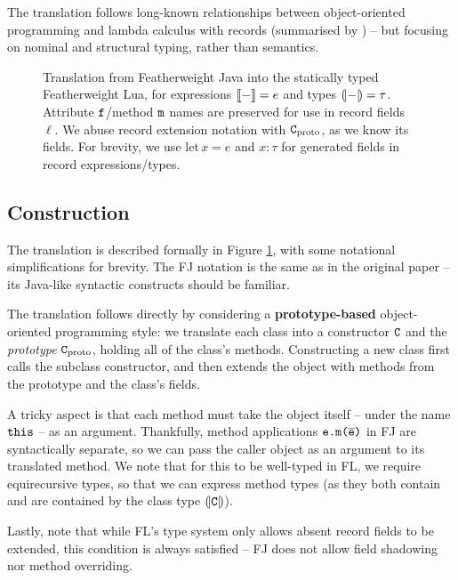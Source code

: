The translation follows long-known relationships between object-oriented programming and lambda calculus with records (summarised by \eg{} \textcite{pierce-thesis}) -- but focusing on nominal and structural typing, rather than semantics.


\begin{figure}
    \centering
    
    \vspace{-1.2em}
    \caption{Translation from Featherweight Java into the statically typed Featherweight Lua, for expressions $\denot{-} = e$ and types $\denoty{-} = \tau$. 
    Attribute $\texttt{f}$/method $\texttt{m}$ names are preserved for use in record fields $\ell$. We abuse record extension notation with $\texttt{C}_\mathrm{proto}$, as we know its fields. For brevity, we use $\mathrm{let}\,x=e$ and $x: \tau$ for generated fields in record expressions/types.}
    \label{fig:translation}
\end{figure}

\subsection{Construction}

The translation is described formally in Figure \ref{fig:translation}, with some notational simplifications for brevity. The FJ notation is the same as in the original paper \cite{featherweight-java} -- its Java-like syntactic constructs should be familiar.

The translation follows directly by considering a \textbf{prototype-based} object-oriented programming style: we translate each class into a constructor $\texttt{C}$ and the \emph{prototype} $\texttt{C}_\mathrm{proto}$, holding all of the class's methods. Constructing a new class first calls the subclass constructor, and then extends the object with methods from the prototype and the class's fields.

A tricky aspect is that each method must take the object itself -- under the name $\texttt{this}$ -- as an argument. Thankfully, method applications $\texttt{e.m($\overline{\mbox{e}}$)}$ in FJ are syntactically separate, so we can pass the caller object as an argument to its translated method. 
We note that for this to be well-typed in FL, we require equirecursive types, so that we can express method types (as they both contain and are contained by the class type $\denoty{\fj C}$).

Lastly, note that while FL's type system only allows absent record fields to be extended, this condition is always satisfied -- FJ does not allow field shadowing nor method overriding.

